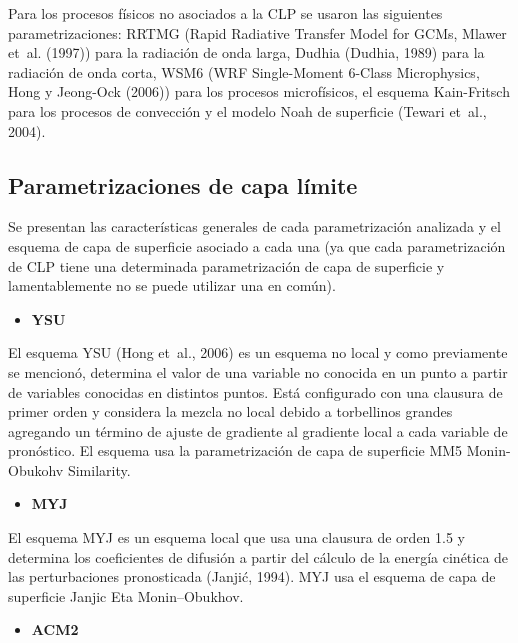 \documentclass[12pt,spanish,oneside]{book}
\providecommand{\tightlist}{%
  \setlength{\itemsep}{0pt}\setlength{\parskip}{0pt}}
\begin{document}
Para los procesos físicos no asociados a la CLP se usaron las siguientes
parametrizaciones: RRTMG (Rapid Radiative Transfer Model for GCMs,
Mlawer et~al. (1997)) para la radiación de onda larga, Dudhia (Dudhia,
1989) para la radiación de onda corta, WSM6 (WRF Single-Moment 6-Class
Microphysics, Hong y Jeong-Ock (2006)) para los procesos microfísicos,
el esquema Kain-Fritsch para los procesos de convección y el modelo Noah
de superficie (Tewari et~al., 2004).

\subsection{Parametrizaciones de capa
límite}\label{parametrizaciones-de-capa-limite}

Se presentan las características generales de cada parametrización
analizada y el esquema de capa de superficie asociado a cada una (ya que
cada parametrización de CLP tiene una determinada parametrización de
capa de superficie y lamentablemente no se puede utilizar una en común).

\begin{itemize}
\tightlist
\item
  \textbf{YSU}
\end{itemize}

El esquema YSU (Hong et~al., 2006) es un esquema no local y como
previamente se mencionó, determina el valor de una variable no conocida
en un punto a partir de variables conocidas en distintos puntos. Está
configurado con una clausura de primer orden y considera la mezcla no
local debido a torbellinos grandes agregando un término de ajuste de
gradiente al gradiente local a cada variable de pronóstico. El esquema
usa la parametrización de capa de superficie MM5 Monin-Obukohv
Similarity.

\begin{itemize}
\tightlist
\item
  \textbf{MYJ}
\end{itemize}

El esquema MYJ es un esquema local que usa una clausura de orden 1.5 y
determina los coeficientes de difusión a partir del cálculo de la
energía cinética de las perturbaciones pronosticada (Janjić, 1994). MYJ
usa el esquema de capa de superficie Janjic Eta Monin--Obukhov.

\begin{itemize}
\tightlist
\item
  \textbf{ACM2}
\end{itemize}
\end{document}
